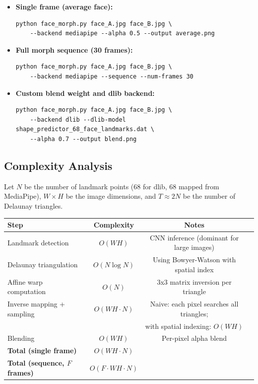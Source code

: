 \begin{itemize}
    \item \textbf{Single frame (average face):}
    \begin{verbatim}
python face_morph.py face_A.jpg face_B.jpg \
    --backend mediapipe --alpha 0.5 --output average.png
    \end{verbatim}

    \item \textbf{Full morph sequence (30 frames):}
    \begin{verbatim}
python face_morph.py face_A.jpg face_B.jpg \
    --backend mediapipe --sequence --num-frames 30
    \end{verbatim}

    \item \textbf{Custom blend weight and dlib backend:}
    \begin{verbatim}
python face_morph.py face_A.jpg face_B.jpg \
    --backend dlib --dlib-model shape_predictor_68_face_landmarks.dat \
    --alpha 0.7 --output blend.png
    \end{verbatim}
\end{itemize}

\subsection{Complexity Analysis}

Let $N$ be the number of landmark points (68 for dlib, 68 mapped from MediaPipe), $W \times H$ be the image dimensions, and $T \approx 2N$ be the number of Delaunay triangles.

\begin{table}[h]
\centering
\begin{tabularx}{\textwidth}{lccc}
\toprule
\textbf{Step} & \textbf{Complexity} & \textbf{Notes} \\
\midrule
Landmark detection & $O(WH)$ & CNN inference (dominant for large images) \\
Delaunay triangulation & $O(N \log N)$ & Using Bowyer-Watson with spatial index \\
Affine warp computation & $O(N)$ & 3x3 matrix inversion per triangle \\
Inverse mapping + sampling & $O(WH \cdot N)$ & Naive: each pixel searches all triangles; \\
& & with spatial indexing: $O(WH)$ \\
Blending & $O(WH)$ & Per-pixel alpha blend \\
\midrule
\textbf{Total (single frame)} & \textbf{$O(WH \cdot N)$} & & \\
\midrule
\textbf{Total (sequence, $F$ frames)} & \textbf{$O(F \cdot WH \cdot N)$} & & \\
\bottomrule
\end{tabularx}
\end{table}

